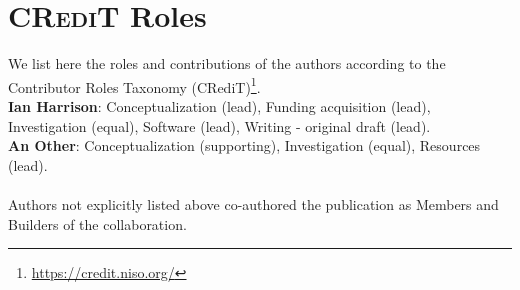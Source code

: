 \section{CR\textsc{edi}T Roles}
We list here the roles and contributions of the authors according to the Contributor Roles Taxonomy (CRediT)\footnote{\url{https://credit.niso.org/}}. \\ 

\noindent\textbf{Ian Harrison}: Conceptualization (lead), Funding acquisition (lead), Investigation (equal), Software (lead), Writing - original draft (lead).\\ 
\textbf{An Other}: Conceptualization (supporting), Investigation (equal), Resources (lead).\\
\\
Authors not explicitly listed above co-authored the publication as Members and Builders of the collaboration.